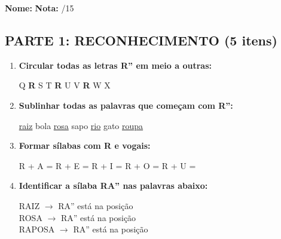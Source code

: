 \begin{exercicio}

\noindent\textbf{Nome:} \underline{\hspace{4cm}} \quad \textbf{Nota:} \underline{\hspace{1cm}}/15

\subsection*{PARTE 1: RECONHECIMENTO (5 itens)}

\begin{enumerate}
  \item \textbf{Circular todas as letras R'' em meio a outras:}
  \begin{center}
  Q \quad \textbf{R} \quad S \quad T \quad \textbf{R} \quad U \quad V \quad \textbf{R} \quad W \quad X
  \end{center}

  \item \textbf{Sublinhar todas as palavras que começam com R'':}
  \begin{center}
  \uline{raiz} \quad bola \quad \uline{rosa} \quad sapo \quad \uline{rio} \quad gato \quad \uline{roupa}
  \end{center}

  \item \textbf{Formar sílabas com R e vogais:}
  \begin{center}
  R + A = \underline{\hspace{1.5cm}} \quad R + E = \underline{\hspace{1.5cm}} \quad R + I = \underline{\hspace{1.5cm}} \quad R + O = \underline{\hspace{1.5cm}} \quad R + U = \underline{\hspace{1.5cm}}
  \end{center}

  \item \textbf{Identificar a sílaba RA'' nas palavras abaixo:}
  \begin{center}
  RAIZ $\rightarrow$ RA'' está na posição \underline{\hspace{1cm}} \\
  ROSA $\rightarrow$ RA'' está na posição \underline{\hspace{1cm}} \\
  RAPOSA $\rightarrow$ RA'' está na posição \underline{\hspace{1cm}}
  \end{center}


\end{enumerate}
\end{exercicio}
